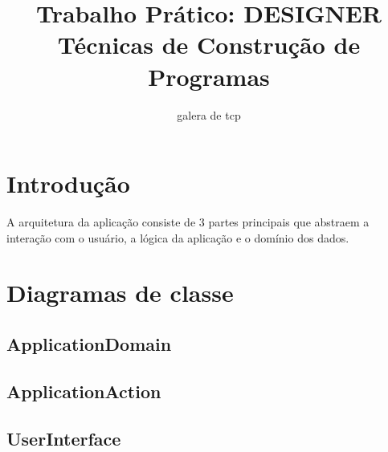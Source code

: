 \documentclass[11pt]{article}
\author{galera de tcp}
\date{}
\title{Trabalho Prático: DESIGNER\\\medskip
\large Técnicas de Construção de Programas}
\begin{document}
\maketitle

\section*{Introdução}
\label{sec:org675c36a}
A arquitetura da aplicação consiste de 3 partes principais que abstraem a
interação com o usuário, a lógica da aplicação e o domínio dos dados.
\section*{Diagramas de classe}
\label{sec:org90b35b4}
\subsection*{ApplicationDomain}
\label{sec:org393ed79}
\subsection*{ApplicationAction}
\label{sec:org9e42b43}
\subsection*{UserInterface}
\label{sec:org19bac57}
\end{document}
